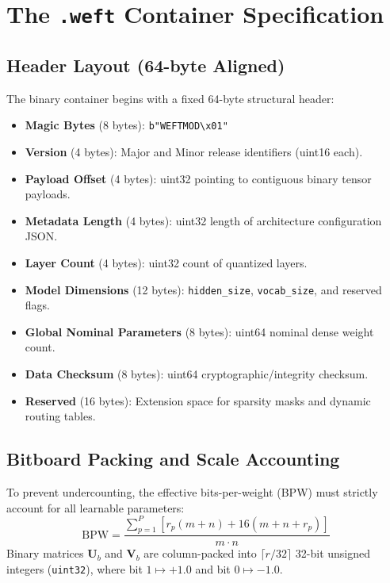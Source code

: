 \documentclass[11pt,a4paper]{article}
\begin{document}
\section{The \texttt{.weft} Container Specification}

\subsection{Header Layout (64-byte Aligned)}
The binary container begins with a fixed 64-byte structural header:
\begin{itemize}
    \item \textbf{Magic Bytes} (8 bytes): \texttt{b"WEFTMOD\textbackslash x01"}
    \item \textbf{Version} (4 bytes): Major and Minor release identifiers (uint16 each).
    \item \textbf{Payload Offset} (4 bytes): uint32 pointing to contiguous binary tensor payloads.
    \item \textbf{Metadata Length} (4 bytes): uint32 length of architecture configuration JSON.
    \item \textbf{Layer Count} (4 bytes): uint32 count of quantized layers.
    \item \textbf{Model Dimensions} (12 bytes): \texttt{hidden\_size}, \texttt{vocab\_size}, and reserved flags.
    \item \textbf{Global Nominal Parameters} (8 bytes): uint64 nominal dense weight count.
    \item \textbf{Data Checksum} (8 bytes): uint64 cryptographic/integrity checksum.
    \item \textbf{Reserved} (16 bytes): Extension space for sparsity masks and dynamic routing tables.
\end{itemize}

\subsection{Bitboard Packing and Scale Accounting}
To prevent undercounting, the effective bits-per-weight (BPW) must strictly account for all learnable parameters:
\begin{equation}
\text{BPW} = \frac{\sum_{p=1}^P \left[ r_p(m + n) + 16(m + n + r_p) \right]}{m \cdot n}
\end{equation}
Binary matrices $\mathbf{U}_{b}$ and $\mathbf{V}_{b}$ are column-packed into $\lceil r / 32 \rceil$ 32-bit unsigned integers (\texttt{uint32}), where bit $1 \mapsto +1.0$ and bit $0 \mapsto -1.0$.
\end{document}
